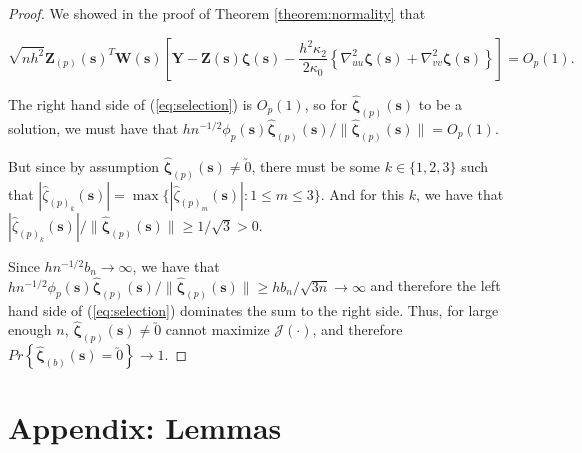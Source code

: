 \documentclass[12pt,english,authoryear, review]{article}\usepackage[]{graphicx}\usepackage[]{color}
\theoremstyle{plain}
\theoremstyle{plain}
\begin{document}
\begin{proof}
We showed in the proof of Theorem \ref{theorem:normality} that

\[
\sqrt{nh^{2}}\bm{Z}_{\left(p\right)}\left(\bm{s}\right)^{T}\bm{W}\left(\bm{s}\right)\left[\bm{Y}-\bm{Z}\left(\bm{s}\right)\bm{\zeta}\left(\bm{s}\right)-\frac{h^{2}\kappa_{2}}{2\kappa_{0}}\left\{ \nabla_{uu}^{2}\bm{\zeta}\left(\bm{s}\right)+\nabla_{vv}^{2}\bm{\zeta}\left(\bm{s}\right)\right\} \right]=O_{p}\left(1\right).
\]


The right hand side of (\ref{eq:selection}) is $O_{p}(1)$, so for
$\hat{\bm{\zeta}}_{\left(p\right)}\left(\bm{s}\right)$ to be a solution,
we must have that $hn^{-1/2}\phi_{p}\left(\bm{s}\right)\hat{\bm{\zeta}}_{\left(p\right)}\left(\bm{s}\right)/\|\hat{\bm{\zeta}}_{\left(p\right)}\left(\bm{s}\right)\|=O_{p}\left(1\right)$.

But since by assumption $\hat{\bm{\zeta}}_{\left(p\right)}\left(\bm{s}\right)\ne\utilde{0}$,
there must be some $k\in\{1,2,3\}$ such that $|\hat{\zeta}_{\left(p\right)_{k}}\left(\bm{s}\right)|=\max\{|\hat{\zeta}_{\left(p\right)_{m}}\left(\bm{s}\right)|:1\le m\le3\}$.
And for this $k$, we have that $|\hat{\zeta}_{\left(p\right)_{k}}\left(\bm{s}\right)|/\|\hat{\bm{\zeta}}_{\left(p\right)}\left(\bm{s}\right)\|\ge1/\sqrt{3}>0$.

Since $hn^{-1/2}b_{n}\to\infty$, we have that $hn^{-1/2}\phi_{p}\left(\bm{s}\right)\hat{\bm{\zeta}}_{\left(p\right)}\left(\bm{s}\right)/\|\hat{\bm{\zeta}}_{\left(p\right)}\left(\bm{s}\right)\|\ge hb_{n}/\sqrt{3n}\to\infty$
and therefore the left hand side of (\ref{eq:selection}) dominates
the sum to the right side. Thus, for large enough $n$, $\hat{\bm{\zeta}}_{\left(p\right)}\left(\bm{s}\right)\ne\utilde{0}$
cannot maximize $\mathcal{J}\left(\cdot\right)$, and therefore $Pr\left\{ \hat{\bm{\zeta}}_{(b)}\left(\bm{s}\right)=\utilde{0}\right\} \to1$. 
\end{proof}

\section*{Appendix: Lemmas}
\end{document}
